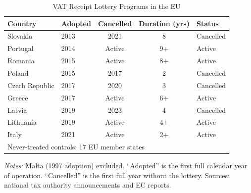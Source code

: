\begin{table}[t]
\centering
\caption{VAT Receipt Lottery Programs in the EU}
\label{tab:programs}
\begin{tabular}{llccl}
\toprule
Country & Adopted & Cancelled & Duration (yrs) & Status \\
\midrule
Slovakia & 2013 & 2021 & 8 & Cancelled \\
Portugal & 2014 & Active & 9+ & Active \\
Romania & 2015 & Active & 8+ & Active \\
Poland & 2015 & 2017 & 2 & Cancelled \\
Czech Republic & 2017 & 2020 & 3 & Cancelled \\
Greece & 2017 & Active & 6+ & Active \\
Latvia & 2019 & 2023 & 4 & Cancelled \\
Lithuania & 2019 & Active & 4+ & Active \\
Italy & 2021 & Active & 2+ & Active \\
\midrule
\multicolumn{5}{l}{Never-treated controls: 17 EU member states} \\
\bottomrule
\end{tabular}
\begin{tablenotes}
\small
\item \textit{Notes:} Malta (1997 adoption) excluded. ``Adopted'' is the first full calendar year of operation. ``Cancelled'' is the first full year without the lottery. Sources: national tax authority announcements and EC reports.
\end{tablenotes}
\end{table}
